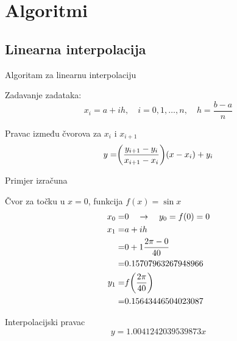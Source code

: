 \documentclass[10pt]{beamer}
\begin{document}
\section{Algoritmi}
\subsection{Linearna interpolacija}
\begin{frame}{Algoritam za linearnu interpolaciju}
	\begin{alertblock}{Zadavanje zadataka:}
		\begin{equation*}
		x_i=a+ih,\quad i=0,1,\ldots,n,\quad h=\frac{b-a}{n}
		\end{equation*}
	\end{alertblock}

	\begin{alertblock}{Pravac između čvorova za $x_i$ i $x_{i+1}$}
		\begin{equation}
		y=\biggr{(}\frac{y_{i+1}-y_i}{x_{i+1}-x_i}\biggr{)}(x-x_i)+y_i
		\label{pravac}
		\end{equation}
	\end{alertblock}

	
\end{frame}
\begin{frame}{Primjer izračuna}
	\begin{exampleblock}{Čvor za točku u $x=0$, funkcija $f(x)=\sin x$}
		\begin{align*}
		x_0=&0\quad\rightarrow \quad y_0=f(0)=0\\
		x_1=&a+ih\\=&0+1\frac{2\pi-0}{40}\\
		=&0.15707963267948966\\
		y_1=&f\biggr{(}\frac{2\pi}{40}\biggr{)}\\=&0.15643446504023087
		\end{align*}
	\end{exampleblock}
	\begin{exampleblock}{Interpolacijski pravac}
		\begin{equation}
		y=1.0041242039539873x
		\label{linInt1}
		\end{equation}
	\end{exampleblock}
\end{frame}
\end{document}
